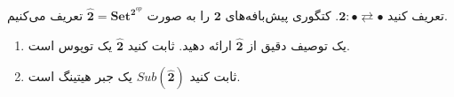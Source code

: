 تعریف کنید $\mathbf{2} : \bullet \rightleftarrows \bullet$.
کتگوری پیش‌بافه‌های $\mathbf{2}$ را به صورت $\hat{\mathbf{2}} = \mathbf{Set}^{\mathbf{2}^{op}}$ تعریف می‌کنیم.
\begin{enumerate}[label=(\harfi*)]
  \item یک توصیف دقیق از $\hat{\mathbf{2}}$ ارائه دهید. \inlineitem ثابت کنید $\hat{\mathbf{2}}$ یک توپوس است.
  \item ثابت کنید $Sub(\hat{\mathbf{2}})$ یک جبر هیتینگ است.
\end{enumerate}
